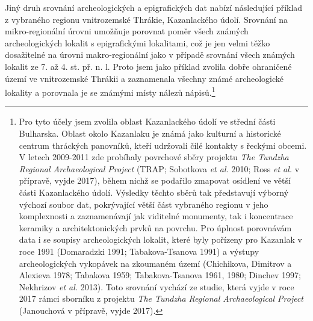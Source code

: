Jiný druh srovnání archeologických a epigrafických dat nabízí následující příklad z vybraného regionu vnitrozemské Thrákie, Kazanlackého údolí. Srovnání na mikro-regionální úrovni umožňuje porovnat poměr všech známých archeologických lokalit s epigrafickými lokalitami, což je jen velmi těžko dosažitelné na úrovni makro-regionální jako v případě srovnání všech známých lokalit ze 7. až 4. st. př. n. l. Proto jsem jako příklad zvolila dobře ohraničené území ve vnitrozemské Thrákii a zaznamenala všechny známé archeologické lokality a porovnala je se známými místy nálezů nápisů.\footnote{Pro tyto účely jsem zvolila oblast Kazanlackého údolí ve střední části Bulharska. Oblast okolo Kazanlaku je známá jako kulturní a historické centrum thráckých panovníků, kteří udržovali čilé kontakty s řeckými obcemi. V letech 2009-2011 zde probíhaly povrchové sběry projektu {\em The Tundzha Regional Archaeological Project} (TRAP; Sobotkova {\em et al.} 2010; Ross {\em et al.} v přípravě, vyjde 2017), během nichž se podařilo zmapovat osídlení ve větší části Kazanlackého údolí. Výsledky těchto sběrů tak představují výborný výchozí soubor dat, pokrývající větší část vybraného regionu v jeho komplexnosti a zaznamenávají jak viditelné monumenty, tak i koncentrace keramiky a architektonických prvků na povrchu. Pro úplnost porovnávám data i se soupisy archeologických lokalit, které byly pořízeny pro Kazanlak v roce 1991 (Domaradzki 1991; Tabakova-Tsanova 1991) a výstupy archeologických vykopávek na zkoumaném území (Chichikova, Dimitrov a Alexieva 1978; Tabakova 1959; Tabakova-Tsanova 1961, 1980; Dinchev 1997; Nekhrizov {\em et al.} 2013). Toto srovnání vychází ze studie, která vyjde v roce 2017 rámci sborníku z projektu {\em The Tundzha Regional Archaeological Project} (Janouchová v přípravě, vyjde 2017).}

